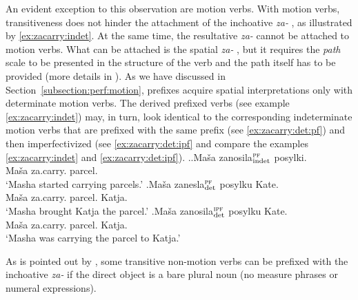 An evident exception to this observation are motion verbs. With motion verbs, transitiveness does not hinder the attachment of the inchoative  \textit{za-}  , as illustrated by \ref{ex:zacarry:indet}. At the same time, the resultative  \textit{za-}   cannot be attached to motion verbs. What can be attached is the spatial  \textit{za-}  , but it requires the \textit{path} scale to be presented in the structure of the verb and the path itself has to be provided (more details in \citealt{ZinovaOsswald:paper}). As we have discussed in Section~\ref{subsection:perf:motion}, prefixes acquire spatial  interpretations only with determinate motion verbs. The derived prefixed verbs (see example \ref{ex:zacarry:indet}) may, in turn, look identical to the corresponding indeterminate motion verbs that are prefixed with the same prefix (see \ref{ex:zacarry:det:pf}) and then imperfectivized (see \ref{ex:zacarry:det:ipf} and compare the examples \ref{ex:zacarry:indet} and \ref{ex:zacarry:det:ipf}).
 \ex.\label{ex:zacarry}\ag.\label{ex:zacarry:indet}Ma\v{s}a zanosila$^{\textsc{pf}}_{\text{\normalfont indet}}$ posylki.\\
 Ma\v{s}a za.carry. parcel.\\
 \trans `Masha started carrying parcels.'
\bg.\label{ex:zacarry:det:pf}Ma\v{s}a zanesla$^{\textsc{pf}}_{\text{\normalfont det}}$ posylku Kate.\\
 Ma\v{s}a za.carry. parcel. Katja.\\
 \trans `Masha brought Katja the parcel.'
\bg.\label{ex:zacarry:det:ipf}Ma\v{s}a zanosila$^{\textsc{ipf}}_{\text{\normalfont det}}$ posylku Kate.\\
 Ma\v{s}a za.carry. parcel. Katja.\\
 \trans `Masha was carrying the parcel to Katja.'
 
As is pointed out by \citet[227]{Braginsky:08}, some transitive non-motion verbs can be prefixed with the inchoative  \textit{za-}   if the direct object is a bare plural noun (no measure phrases or numeral expressions).

